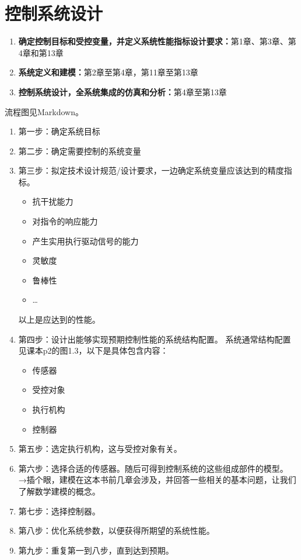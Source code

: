 \documentclass[oneside,a4paper]{ctexbook}
\begin{document}
\section{控制系统设计}

\begin{tcolorbox}[colback=white,colframe=blue!70!green,colupper=blue!45!black,fonttitle=\bfseries,title=书中章节与控制系统的设计流程模块关系]
    \begin{enumerate}
        \item \textbf{确定控制目标和受控变量，并定义系统性能指标设计要求：}第1章、第3章、第4章和第13章
        \item \textbf{系统定义和建模：}第2章至第4章，第11章至第13章
        \item \textbf{控制系统设计，全系统集成的仿真和分析：}第4章至第13章
    \end{enumerate}
流程图见Markdown。
\end{tcolorbox}
\begin{enumerate}
    \item 第一步：确定系统目标
    \item 第二步：确定需要控制的系统变量
    \item 第三步：拟定技术设计规范/设计要求，一边确定系统变量应该达到的精度指标。
    \begin{itemize}    
        \item 抗干扰能力
        \item 对指令的响应能力
        \item 产生实用执行驱动信号的能力
        \item 灵敏度
        \item 鲁棒性
        \item \ldots
    \end{itemize}以上是应达到的性能。

    \item 第四步：设计出能够实现预期控制性能的系统结构配置。
    系统通常结构配置见课本p2的图1.3，以下是具体包含内容：
    \begin{itemize}
        \item 传感器
        \item 受控对象
        \item 执行机构
        \item 控制器
    \end{itemize}
    \item 第五步：选定执行机构，这与受控对象有关。
    \item 第六步：选择合适的传感器。随后可得到控制系统的这些组成部件的模型。
    →插个眼，建模在这本书前几章会涉及，并回答一些相关的基本问题，让我们了解数学建模的概念。
    \item 第七步：选择控制器。
    \item 第八步：优化系统参数，以便获得所期望的系统性能。
    \item 第九步：重复第一到八步，直到达到预期。
\end{enumerate}
\end{document}
